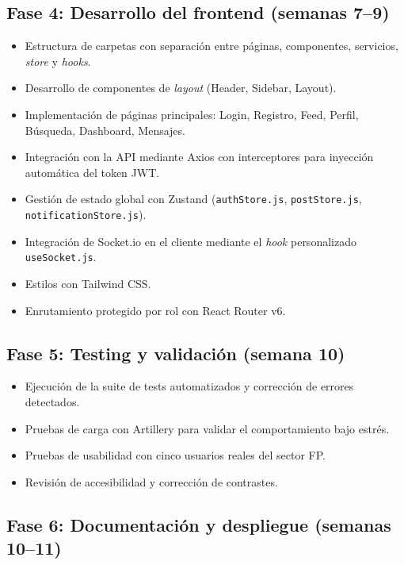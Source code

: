 \documentclass[a4paper]{report}
\begin{document}
\subsection{Fase 4: Desarrollo del frontend (semanas 7--9)}

\begin{itemize}
  \item Estructura de carpetas con separación entre páginas, componentes, servicios, \textit{store} y \textit{hooks}.
  \item Desarrollo de componentes de \textit{layout} (Header, Sidebar, Layout).
  \item Implementación de páginas principales: Login, Registro, Feed, Perfil, Búsqueda, Dashboard, Mensajes.
  \item Integración con la API mediante Axios con interceptores para inyección automática del token JWT.
  \item Gestión de estado global con Zustand (\texttt{authStore.js}, \texttt{postStore.js}, \texttt{notificationStore.js}).
  \item Integración de Socket.io en el cliente mediante el \textit{hook} personalizado \texttt{useSocket.js}.
  \item Estilos con Tailwind CSS.
  \item Enrutamiento protegido por rol con React Router v6.
\end{itemize}

\subsection{Fase 5: Testing y validación (semana 10)}

\begin{itemize}
  \item Ejecución de la suite de tests automatizados y corrección de errores detectados.
  \item Pruebas de carga con Artillery para validar el comportamiento bajo estrés.
  \item Pruebas de usabilidad con cinco usuarios reales del sector FP.
  \item Revisión de accesibilidad y corrección de contrastes.
\end{itemize}

\subsection{Fase 6: Documentación y despliegue (semanas 10--11)}
\end{document}
